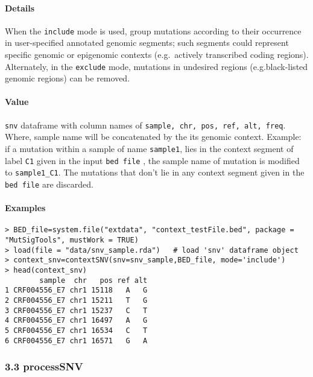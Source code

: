 \documentclass[]{article}
\let\oldparagraph\paragraph
\renewcommand{\paragraph}[1]{\oldparagraph{#1}\mbox{}}
\begin{document}
\paragraph{\texorpdfstring{\textbf{Details}}{Details}}\label{details-1}

When the \texttt{include} mode is used, group mutations according to
their occurrence in user-specified annotated genomic segments; such
segments could represent specific genomic or epigenomic contexts
(e.g.~actively transcribed coding regions). Alternately, in the
\texttt{exclude} mode, mutations in undesired regions (e.g.black-listed
genomic regions) can be removed.

\paragraph{\texorpdfstring{\textbf{Value}}{Value}}\label{value}

\texttt{snv} dataframe with column names of
\texttt{sample,\ chr,\ pos,\ ref,\ alt,\ freq}. Where, sample name will
be concatenated by the its genomic context. Example: if a mutation
within a sample of name \texttt{sample1}, lies in the context segment of
label \texttt{C1} given in the input \texttt{bed\ file} , the sample
name of mutation is modified to \texttt{sample1\_C1}. The mutations that
don't lie in any context segment given in the \texttt{bed\ file} are
discarded.

\paragraph{\texorpdfstring{\textbf{Examples}}{Examples}}\label{examples-1}

\begin{verbatim}
> BED_file=system.file("extdata", "context_testFile.bed", package = "MutSigTools", mustWork = TRUE)
> load(file = "data/snv_sample.rda")   # load 'snv' dataframe object
> context_snv=contextSNV(snv=snv_sample,BED_file, mode='include')
> head(context_snv)
        sample  chr   pos ref alt
1 CRF004556_E7 chr1 15118   A   G
2 CRF004556_E7 chr1 15211   T   G
3 CRF004556_E7 chr1 15237   C   T
4 CRF004556_E7 chr1 16497   A   G
5 CRF004556_E7 chr1 16534   C   T
6 CRF004556_E7 chr1 16571   G   A
\end{verbatim}

\subsubsection{3.3 processSNV}\label{processsnv}
\end{document}
